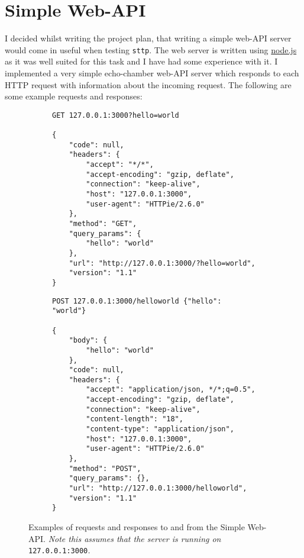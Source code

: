 \section{Simple Web-API}
\label{sec:simple-web-api}

I decided whilst writing the project plan, that writing a simple web-API server would come in useful when testing \verb|sttp|. The web server is written using \href{https://nodejs.org/en/}{node.js} as it was well suited for this task and I have had some experience with it. I implemented a very simple echo-chamber web-API server which responds to each HTTP request with information about the incoming request. The following are some example requests and responses:

\begin{figure}[H]
    \centering
    \begin{subfigure}{.5\textwidth}
        \centering
        \begin{mdframed}
            \begin{Verbatim}[fontsize=\scriptsize]
GET 127.0.0.1:3000?hello=world

{
    "code": null,
    "headers": {
        "accept": "*/*",
        "accept-encoding": "gzip, deflate",
        "connection": "keep-alive",
        "host": "127.0.0.1:3000",
        "user-agent": "HTTPie/2.6.0"
    },
    "method": "GET",
    "query_params": {
        "hello": "world"
    },
    "url": "http://127.0.0.1:3000/?hello=world",
    "version": "1.1"
}
            \end{Verbatim}
        \end{mdframed}
    \end{subfigure}%
    \begin{subfigure}{.5\textwidth}
        \centering
        \begin{mdframed}            
            \begin{Verbatim}[fontsize=\scriptsize]
POST 127.0.0.1:3000/helloworld {"hello": "world"}

{
    "body": {
        "hello": "world"
    },
    "code": null,
    "headers": {
        "accept": "application/json, */*;q=0.5",
        "accept-encoding": "gzip, deflate",
        "connection": "keep-alive",
        "content-length": "18",
        "content-type": "application/json",
        "host": "127.0.0.1:3000",
        "user-agent": "HTTPie/2.6.0"
    },
    "method": "POST",
    "query_params": {},
    "url": "http://127.0.0.1:3000/helloworld",
    "version": "1.1"
}
            \end{Verbatim}
        \end{mdframed}
    \end{subfigure}
    \cprotect\caption{\label{fig:2.2}Examples of requests and responses to and from the Simple Web-API. \textit{Note this assumes that the server is running on }\verb|127.0.0.1:3000|\textit{.}}
\end{figure}
